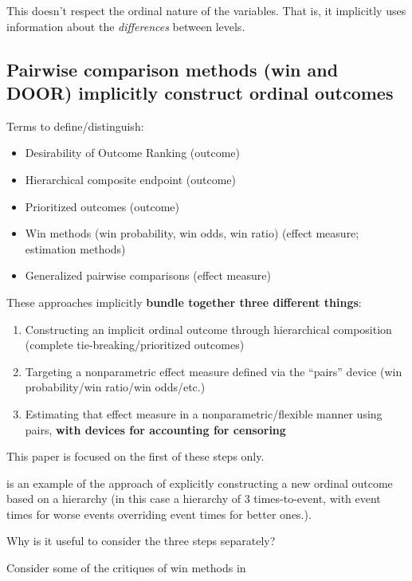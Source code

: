 \documentclass[
  11pt,
  fleqn
]{article}
\begin{document}
This doesn't respect the ordinal nature of the variables. That is, it
implicitly uses information about the \emph{differences} between levels.

\subsection{Pairwise comparison methods (win and DOOR) implicitly construct
ordinal outcomes}

Terms to define/distinguish:
\begin{itemize}
  \item Desirability of Outcome Ranking (outcome)
  \item Hierarchical composite endpoint (outcome)
  \item Prioritized outcomes (outcome)
  \item Win methods (win probability, win odds, win ratio) (effect
    measure; estimation methods)
  \item Generalized pairwise comparisons (effect measure)
\end{itemize}

These approaches implicitly \textbf{bundle together three different things}:
\begin{enumerate}
  \item Constructing an implicit ordinal outcome through
    hierarchical composition (complete tie-breaking/prioritized outcomes)
  \item
    Targeting a nonparametric effect measure defined via the
    ``pairs'' device (win
    probability/win ratio/win odds/etc.)
  \item Estimating that effect measure in a
    nonparametric/flexible manner using pairs, \textbf{with devices for
    accounting for censoring}
\end{enumerate}

This paper is focused on the first of these steps only.

\citet{follmannAnalysisOrderedComposite2020} is an example of the
approach of explicitly constructing a new ordinal outcome based on a
hierarchy (in this case a hierarchy of 3 times-to-event, with event
times for worse events overriding event times for better ones.).

Why is it useful to consider the three steps separately?

Consider some of the critiques of win methods in
\citet[e.g.~][]{ajufoFallaciesUsingWin2023}
\end{document}

